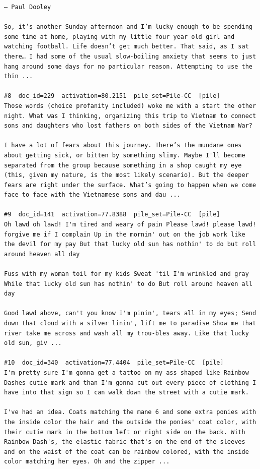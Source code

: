 \begin{verbatim}
— Paul Dooley

So, it’s another Sunday afternoon and I’m lucky enough to be spending some time at home, playing with my little four year old girl and watching football. Life doesn’t get much better. That said, as I sat there… I had some of the usual slow-boiling anxiety that seems to just hang around some days for no particular reason. Attempting to use the thin ...

#8  doc_id=229  activation=80.2151  pile_set=Pile-CC  [pile]
Those words (choice profanity included) woke me with a start the other night. What was I thinking, organizing this trip to Vietnam to connect sons and daughters who lost fathers on both sides of the Vietnam War?

I have a lot of fears about this journey. There’s the mundane ones about getting sick, or bitten by something slimy. Maybe I'll become separated from the group because something in a shop caught my eye (this, given my nature, is the most likely scenario). But the deeper fears are right under the surface. What’s going to happen when we come face to face with the Vietnamese sons and dau ...

#9  doc_id=141  activation=77.8388  pile_set=Pile-CC  [pile]
Oh lawd oh lawd! I'm tired and weary of pain Please lawd! please lawd! forgive me if I complain Up in the mornin' out on the job work like the devil for my pay But that lucky old sun has nothin' to do but roll around heaven all day

Fuss with my woman toil for my kids Sweat 'til I'm wrinkled and gray While that lucky old sun has nothin' to do But roll around heaven all day

Good lawd above, can't you know I'm pinin', tears all in my eyes; Send down that cloud with a silver linin', lift me to paradise Show me that river take me across and wash all my trou-bles away. Like that lucky old sun, giv ...

#10  doc_id=340  activation=77.4404  pile_set=Pile-CC  [pile]
I'm pretty sure I'm gonna get a tattoo on my ass shaped like Rainbow Dashes cutie mark and than I'm gonna cut out every piece of clothing I have into that sign so I can walk down the street with a cutie mark.

I've had an idea. Coats matching the mane 6 and some extra ponies with the inside color the hair and the outside the ponies' coat color, with their cutie mark in the bottom left or right side on the back. With Rainbow Dash's, the elastic fabric that's on the end of the sleeves and on the waist of the coat can be rainbow colored, with the inside color matching her eyes. Oh and the zipper ...

\end{verbatim}

